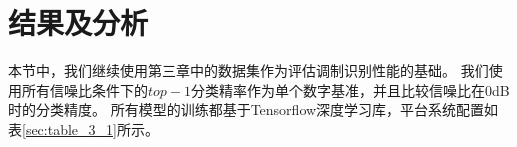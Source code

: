 %
\section{结果及分析}

本节中，我们继续使用第三章中的数据集作为评估调制识别性能的基础。
我们使用所有信噪比条件下的$top-1$分类精率作为单个数字基准，并且比较信噪比在0dB时的分类精度。
所有模型的训练都基于Tensorflow深度学习库，平台系统配置如表\ref{sec:table_3_1}所示。\par

